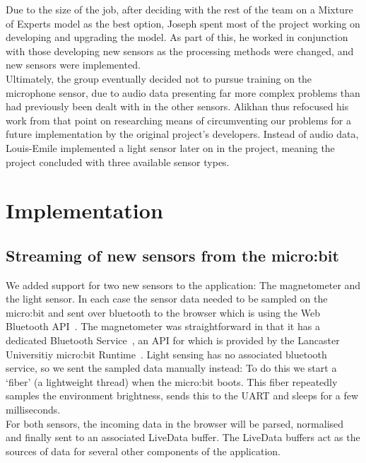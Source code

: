 \documentclass{article}
\begin{document}
Due to the size of the job, after deciding with the rest of the team on a Mixture of Experts model as the best option, Joseph spent most of the project working on developing and upgrading the model. As part of this, he worked in conjunction with those developing new sensors as the processing methods were changed, and new sensors were implemented. \\

Ultimately, the group eventually decided not to pursue training on the microphone sensor, due to audio data presenting far more complex problems than had previously been dealt with in the other sensors. Alikhan thus refocused his work from that point on researching means of circumventing our problems for a future implementation by the original project's developers. Instead of audio data, Louis-Emile implemented a light sensor later on in the project, meaning the project concluded with three available sensor types.

\section{Implementation}%
\label{sec:implementation}

\subsection{Streaming of new sensors from the micro:bit}%
\label{subsec:streaming}
We added support for two new sensors to the application: The magnetometer and the light sensor. In each case the sensor data needed to be sampled on the micro:bit and sent over bluetooth to the browser which is using the Web Bluetooth API~\cite{bluetoothapi}. The magnetometer was straightforward in that it has a dedicated Bluetooth Service~\cite{microbitservices}, an API for which is provided by the Lancaster Universitiy micro:bit Runtime~\cite{magnetometerservice}. Light sensing has no associated bluetooth service, so we sent the sampled data manually instead: To do this we start a `fiber' (a lightweight thread) when the micro:bit boots. This fiber repeatedly samples the environment brightness, sends this to the UART and sleeps for a few milliseconds. \\

For both sensors, the incoming data in the browser will be parsed, normalised and finally sent to an associated LiveData buffer. The LiveData buffers act as the sources of data for several other components of the application. \\
\end{document}
